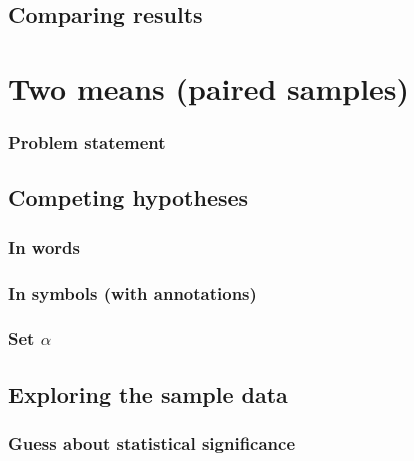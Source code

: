 \documentclass[12pt, krantz2,]{krantz}
\begin{document}
\hypertarget{comparing-results-3}{%
\subsection{Comparing results}\label{comparing-results-3}}

\hypertarget{two-means-paired-samples}{%
\section{Two means (paired samples)}\label{two-means-paired-samples}}

\hypertarget{problem-statement-4}{%
\subsubsection*{Problem statement}\label{problem-statement-4}}


\hypertarget{competing-hypotheses-4}{%
\subsection{Competing hypotheses}\label{competing-hypotheses-4}}

\hypertarget{in-words-4}{%
\subsubsection*{In words}\label{in-words-4}}


\hypertarget{in-symbols-with-annotations-4}{%
\subsubsection*{In symbols (with annotations)}\label{in-symbols-with-annotations-4}}


\hypertarget{set-alpha-4}{%
\subsubsection*{\texorpdfstring{Set \(\alpha\)}{Set \textbackslash{}alpha}}\label{set-alpha-4}}


\hypertarget{exploring-the-sample-data-4}{%
\subsection{Exploring the sample data}\label{exploring-the-sample-data-4}}

\hypertarget{guess-about-statistical-significance-4}{%
\subsubsection*{Guess about statistical significance}\label{guess-about-statistical-significance-4}}
\end{document}
